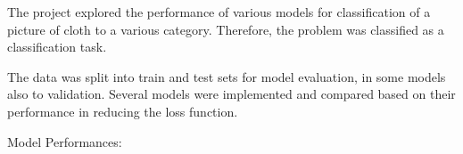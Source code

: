 \documentclass{article}
\begin{document}
The project explored the performance of various models for classification of a picture of cloth to a various category. Therefore, the problem was classified as a classification task.

The data was split into train and test sets for model evaluation, in some models also to validation. Several models were implemented and compared based on their performance in reducing the loss function.

Model Performances:





\end{document}
